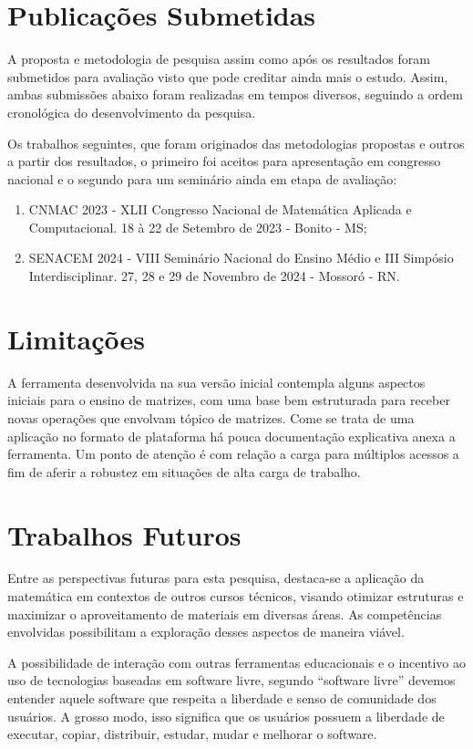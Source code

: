 \section{Publicações Submetidas}
\label{publicacoes}

A proposta e metodologia de pesquisa assim como após os resultados foram submetidos para avaliação visto que pode creditar ainda mais o estudo. Assim, ambas submissões abaixo foram realizadas em tempos diversos, seguindo a ordem cronológica do desenvolvimento da pesquisa.

Os trabalhos seguintes, que foram originados das metodologias propostas e outros a partir dos resultados, o primeiro foi aceitos para apresentação em congresso nacional e o segundo para um seminário ainda em etapa de avaliação:

\begin{enumerate}
   \item CNMAC 2023 - XLII Congresso Nacional de Matemática Aplicada e Computacional. 18 à 22 de Setembro de 2023 - Bonito - MS;

   \item SENACEM 2024 - VIII Seminário Nacional do Ensino Médio e III Simpósio Interdisciplinar. 27, 28 e 29 de Novembro de 2024 - Mossoró - RN.
\end{enumerate}




\section{Limitações}
\label{limitacoes}

A ferramenta desenvolvida na sua versão inicial contempla alguns aspectos iniciais para o ensino de matrizes, com uma base bem estruturada para receber novas operações que envolvam tópico de matrizes. Come se trata de uma aplicação no formato de plataforma há pouca documentação explicativa anexa a ferramenta. Um ponto de atenção é com relação a carga para múltiplos acessos a fim de aferir a robustez em situações de alta carga de trabalho.

\section{Trabalhos Futuros}
\label{trabalhos_futuros}

Entre as perspectivas futuras para esta pesquisa, destaca-se a aplicação da matemática em contextos de outros cursos técnicos, visando otimizar estruturas e maximizar o aproveitamento de materiais em diversas áreas. As competências envolvidas possibilitam a exploração desses aspectos de maneira viável.

A possibilidade de interação com outras ferramentas educacionais e o incentivo ao uso de tecnologias baseadas em software livre, segundo  “software livre” devemos entender aquele software que respeita a liberdade e senso de comunidade dos usuários. A grosso modo, isso significa que os usuários possuem a liberdade de executar, copiar, distribuir, estudar, mudar e melhorar o software.

